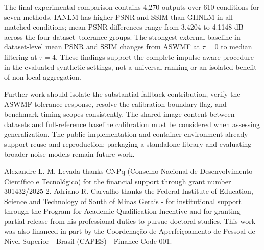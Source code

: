 \documentclass[pdflatex,iicol,sn-mathphys-num]{sn-jnl}
\newif\ifshowportuguese
\newcommand{\pt}[1]{\ifshowportuguese\par\begingroup\small\color{blue!55!black}\noindent\textbf{PT: }#1\par\endgroup\fi}
\begin{document}
The final experimental comparison contains 4,270 outputs over 610 conditions for seven methods. IANLM has higher PSNR and SSIM than GHNLM in all matched conditions; mean PSNR differences range from 3.4204 to 4.1148 dB across the four dataset--tolerance groups. The strongest external baseline in dataset-level mean PSNR and SSIM changes from ASWMF at $\tau=0$ to median filtering at $\tau=4$. These findings support the complete impulse-aware procedure in the evaluated synthetic settings, not a universal ranking or an isolated benefit of non-local aggregation.
\pt{A comparação experimental final contém 4.270 saídas em 610 condições para sete métodos. O IANLM apresenta PSNR e SSIM maiores que o GHNLM em todas as condições correspondentes; as diferenças médias de PSNR variam de 3,4204 a 4,1148 dB nos quatro grupos de conjunto e tolerância. O baseline externo mais forte em PSNR e SSIM médios por conjunto muda de ASWMF em $\tau=0$ para filtro de mediana em $\tau=4$. Esses achados sustentam o procedimento completo orientado a impulsos nas configurações sintéticas avaliadas, não um ranking universal nem um benefício isolado da agregação não local.}

Further work should isolate the substantial fallback contribution, verify the ASWMF tolerance response, resolve the calibration boundary flag, and benchmark timing scopes consistently. The shared image content between datasets and full-reference baseline calibration must be considered when assessing generalization. The public implementation and container environment already support reuse and reproduction; packaging a standalone library and evaluating broader noise models remain future work.
\pt{Trabalhos adicionais devem isolar a contribuição substancial do fallback, verificar a resposta do ASWMF à tolerância, esclarecer a marcação de borda da calibração e medir tempos com escopos consistentes. O conteúdo de imagem compartilhado entre conjuntos e a calibração dos baselines com referência completa devem ser considerados ao avaliar generalização. A implementação pública e o ambiente em contêiner já permitem reutilização e reprodução; empacotar uma biblioteca independente e avaliar modelos de ruído mais amplos permanecem como trabalhos futuros.}

\backmatter
{}
Alexandre L. M. Levada thanks CNPq (Conselho Nacional de Desenvolvimento Científico e Tecnológico) for the financial support through grant number 301432/2025-2.  Adriano R. Carvalho thanks the Federal Institute of Education, Science and Technology of South of Minas Gerais - for institutional support through the Program for Academic Qualification Incentive and for granting partial release from his professional duties to pursue doctoral studies. This work was also financed in part by the Coordenação de Aperfeiçoamento de Pessoal de Nível Superior - Brasil (CAPES) - Finance Code 001.
\end{document}
